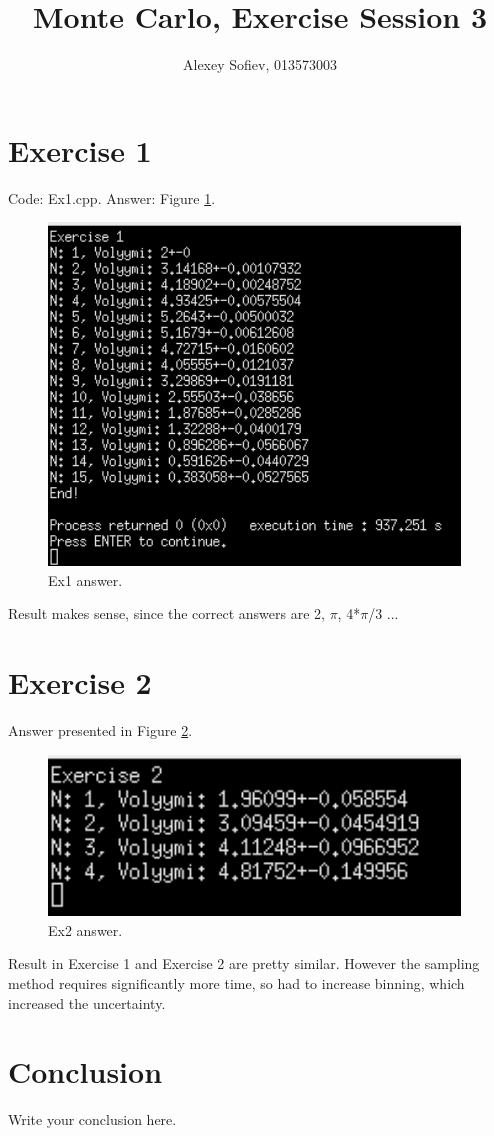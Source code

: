 \documentclass{article}
\begin{document}
\title{Monte Carlo, Exercise Session 3}
\author{Alexey Sofiev, 013573003}

\maketitle


\section{Exercise 1}
Code: Ex1.cpp. Answer: Figure \ref{fig:ex1_answer}.

\begin{figure}[!hbt]
    \centering
    \includegraphics[width=4.3in]{ex1_answer}
    \caption{Ex1 answer.}
    \label{fig:ex1_answer}
\end{figure}

	Result makes sense, since the correct answers are 2, $\pi$, 4*$\pi$/3 ...


\section{Exercise 2}
Answer presented in Figure \ref{fig:ex2_answer}.
\begin{figure}[!hbt]
	\centering
	\includegraphics[width=4.3in]{ex2_answer}
	\caption{Ex2 answer.}
	\label{fig:ex2_answer}
\end{figure}

Result in Exercise 1 and Exercise 2 are pretty similar. However the sampling method requires significantly more time, so had to increase binning, which increased the uncertainty.


\section{Conclusion}
Write your conclusion here.
\end{document}
